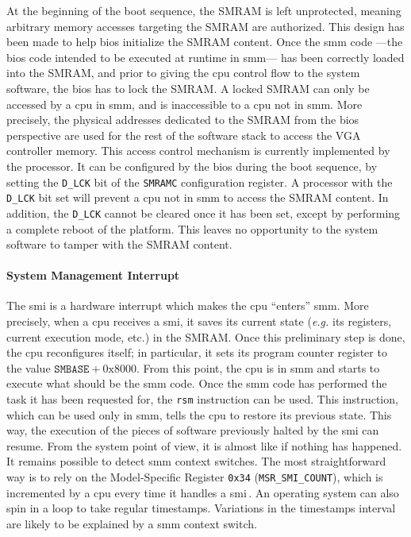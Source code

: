 At the beginning of the boot sequence, the SMRAM is left unprotected, meaning
arbitrary memory accesses targeting the SMRAM are authorized.
%
This design has been made to help \ac{bios} initialize the SMRAM content.
%
Once the \ac{smm} code ---the \ac{bios} code intended to be executed at runtime
in \ac{smm}--- has been correctly loaded into the SMRAM, and prior to giving the
\ac{cpu} control flow to the system software, the \ac{bios} has to lock the
SMRAM.
%
A locked SMRAM can only be accessed by a \ac{cpu} in \ac{smm}, and is
inaccessible to a \ac{cpu} not in \ac{smm}.
%
More precisely, the physical addresses dedicated to the SMRAM from the \ac{bios}
perspective are used for the rest of the software stack to access the VGA
controller memory.
%
This access control mechanism is currently implemented by the processor.
%
It can be configured by the \ac{bios} during the boot sequence, by setting the
\texttt{D\_LCK} bit of the \texttt{SMRAMC} configuration register.
%
A processor with the \texttt{D\_LCK} bit set will prevent a \ac{cpu} not in
\ac{smm} to access the SMRAM content.
%
In addition, the \texttt{D\_LCK} cannot be cleared once it has been set, except
by performing a complete reboot of the platform.
%
This leaves no opportunity to the system software to tamper with the SMRAM
content.

\paragraph{System Management Interrupt}

The \ac{smi} is a hardware interrupt which makes the \ac{cpu} ``enters''
\ac{smm}.
%
More precisely, when a \ac{cpu} receives a \ac{smi}, it saves its current state
(\emph{e.g.} its registers, current execution mode, etc.) in the SMRAM.
%
Once this preliminary step is done, the \ac{cpu} reconfigures itself;
%
in particular, it sets its program counter register to the value
$\mathtt{SMBASE} + \mathrm{0x8000}$.
%
From this point, the \ac{cpu} is in \ac{smm} and starts to execute what should
be the \ac{smm} code.
%
Once the \ac{smm} code has performed the task it has been requested for, the
\texttt{rsm} instruction can be used.
%
This instruction, which can be used only in \ac{smm}, tells the \ac{cpu} to
restore its previous state.
%
This way, the execution of the pieces of software previously halted by the
\ac{smi} can resume.
%
From the system point of view, it is almost like if nothing has happened.
%
It remains possible to detect \ac{smm} context switches.
%
The most straightforward way is to rely on the Model-Specific Register
\texttt{0x34} (\texttt{MSR\_SMI\_COUNT}), which is incremented by a \ac{cpu}
every time it handles a \ac{smi}\,\cite[Volume 4, Chapter 2]{intel2014manual}.
%
An operating system can also spin in a loop to take regular timestamps.
%
Variations in the timestamps interval are likely to be explained by a \ac{smm}
context switch.

